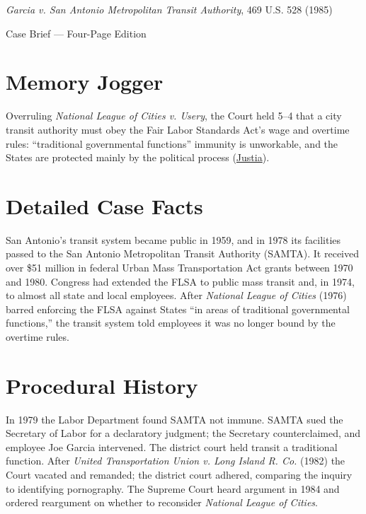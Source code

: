 \documentclass[12pt]{article}
\begin{document}
\begin{center}
{\LARGE \textit{Garcia v. San Antonio Metropolitan Transit Authority}, 469 U.S. 528 (1985)\par}
\vspace{0.8em}
{\large Case Brief --- Four-Page Edition\par}
\end{center}
\vspace{1em}

\section{Memory Jogger}

Overruling \textit{National League of Cities v. Usery}, the Court held 5--4 that a city transit authority must obey the Fair Labor Standards Act's wage and overtime rules: ``traditional governmental functions'' immunity is unworkable, and the States are protected mainly by the political process (\href{https://supreme.justia.com/cases/federal/us/469/528/}{Justia}).

\section{Detailed Case Facts}

San Antonio's transit system became public in 1959, and in 1978 its facilities passed to the San Antonio Metropolitan Transit Authority (SAMTA). It received over \$51 million in federal Urban Mass Transportation Act grants between 1970 and 1980. Congress had extended the FLSA to public mass transit and, in 1974, to almost all state and local employees. After \textit{National League of Cities} (1976) barred enforcing the FLSA against States ``in areas of traditional governmental functions,'' the transit system told employees it was no longer bound by the overtime rules.

\section{Procedural History}

In 1979 the Labor Department found SAMTA not immune. SAMTA sued the Secretary of Labor for a declaratory judgment; the Secretary counterclaimed, and employee Joe Garcia intervened. The district court held transit a traditional function. After \textit{United Transportation Union v. Long Island R. Co.} (1982) the Court vacated and remanded; the district court adhered, comparing the inquiry to identifying pornography. The Supreme Court heard argument in 1984 and ordered reargument on whether to reconsider \textit{National League of Cities}.
\end{document}
